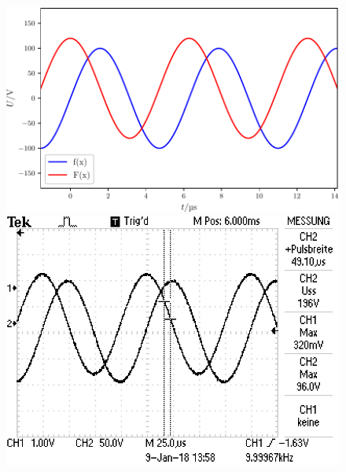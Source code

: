 \begin{figure}
\vspace{2em}
\begin{minipage}{0.48\textwidth}
\centering
\includegraphics[width=\linewidth-10pt,height=\textheight-10pt,keepaspectratio]{content/images/Graph6.pdf}
\end{minipage}
\begin{minipage}{0.48\textwidth}
\centering
\includegraphics[width=\linewidth-10pt,height=\textheight-10pt,keepaspectratio]{content/images/6.jpg}
\end{minipage}


\end{figure}
